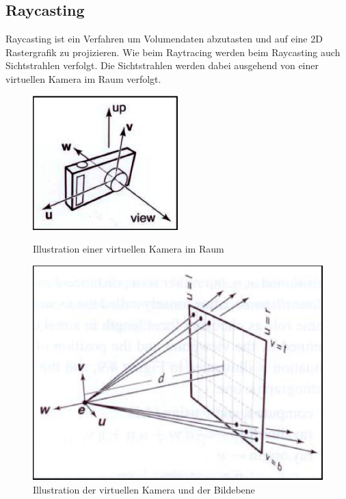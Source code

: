 \subsection{Raycasting}\label{sec::rc}
Raycasting ist ein Verfahren um Volumendaten abzutasten und auf eine 2D Rastergrafik zu projizieren.
Wie beim Raytracing werden beim Raycasting auch Sichtstrahlen verfolgt.
Die Sichtstrahlen werden dabei ausgehend von einer virtuellen Kamera im Raum verfolgt.
\begin{figure}[]
	\centering
	\begin{minipage}[b]{0.49\textwidth}
		\centering
		\includegraphics[width=0.5\textwidth]{../../Grafiken/Virtuelle-Kamera.PNG}
		\caption{Illustration einer virtuellen Kamera im Raum \cite{Dr.MichaelKrone2016/2017}}
		\label{fig::rc01}
	\end{minipage}
	\hfill
	\begin{minipage}[b]{0.49\textwidth}
		\centering
		\includegraphics[width=1\textwidth]{../../Grafiken/Virtuelle-Kamera-und-Bildebene.PNG}
		\caption{Illustration der virtuellen Kamera und der Bildebene \cite{Dr.MichaelKrone2016/2017}}
		\label{fig::rc02}
	\end{minipage}
\end{figure}
